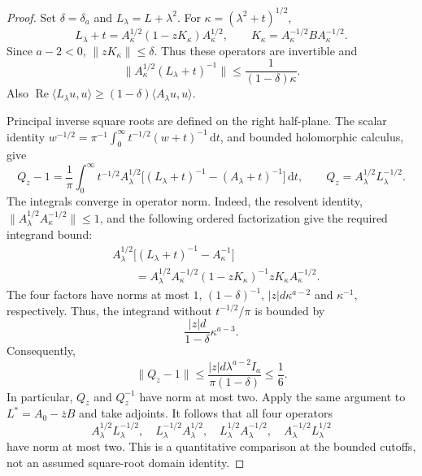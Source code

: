 \documentclass[12pt]{article}
\numberwithin{equation}{section}
\theoremstyle{definition}
\newcommand{\ud}{\,\mathrm{d}}
\begin{document}
\begin{proof}
  Set $\delta=\delta_a$ and $L_\lambda=L+\lambda^2$.
  For $\kappa=(\lambda^2+t)^{1/2}$,
  \[
    L_\lambda+t
    =A_\kappa^{1/2}(1-zK_\kappa)A_\kappa^{1/2},\qquad
    K_\kappa=A_\kappa^{-1/2}BA_\kappa^{-1/2}.
  \]
  Since $a-2<0$, $\|zK_\kappa\|\le\delta$. Thus these operators are
  invertible and
  \[
    \|A_\kappa^{1/2}(L_\lambda+t)^{-1}\|
    \le\frac1{(1-\delta)\kappa}.
  \]
  Also $\operatorname{Re}\langle L_\lambda u,u\rangle
  \ge(1-\delta)\langle A_\lambda u,u\rangle$.

  Principal inverse square roots are defined on the right half-plane.
  The scalar identity
  $w^{-1/2}=\pi^{-1}\int_0^\infty t^{-1/2}(w+t)^{-1}\ud t$,
  and bounded holomorphic calculus, give
  \[
    Q_z-1
    =\frac1\pi\int_0^\infty t^{-1/2}A_\lambda^{1/2}
    \big[(L_\lambda+t)^{-1}-(A_\lambda+t)^{-1}\big]\ud t,
    \qquad Q_z=A_\lambda^{1/2}L_\lambda^{-1/2}.
  \]
  The integrals converge in operator norm. Indeed, the resolvent
  identity, $\|A_\lambda^{1/2}A_\kappa^{-1/2}\|\le1$, and the
  following ordered factorization give the required integrand bound:
  \[
    \begin{split}
      &A_\lambda^{1/2}
      \big[(L_\lambda+t)^{-1}-A_\kappa^{-1}\big]\\
      &\qquad=A_\lambda^{1/2}A_\kappa^{-1/2}
      (1-zK_\kappa)^{-1}zK_\kappa A_\kappa^{-1/2}.
    \end{split}
  \]
  The four factors have norms at most $1$, $(1-\delta)^{-1}$,
  $|z|d\kappa^{a-2}$ and $\kappa^{-1}$, respectively.
  Thus, the integrand without $t^{-1/2}/\pi$ is bounded by
  \[
    \frac{|z|d}{1-\delta}\kappa^{a-3}.
  \]
  Consequently,
  \[
    \|Q_z-1\|
    \le\frac{|z|d\lambda^{a-2}I_a}{\pi(1-\delta)}
    \le\frac16.
  \]
  In particular, $Q_z$ and $Q_z^{-1}$ have norm at most two.
  Apply the same argument to $L^*=A_0-\overline zB$ and take adjoints.
  It follows that all four operators
  \begin{equation}\label{E:phase-root-comparisons}
    A_\lambda^{1/2}L_\lambda^{-1/2},\quad
    L_\lambda^{-1/2}A_\lambda^{1/2},\quad
    L_\lambda^{1/2}A_\lambda^{-1/2},\quad
    A_\lambda^{-1/2}L_\lambda^{1/2}
  \end{equation}
  have norm at most two. This is a quantitative comparison at the
  bounded cutoffs, not an assumed square-root domain identity.


\end{proof}
\end{document}
